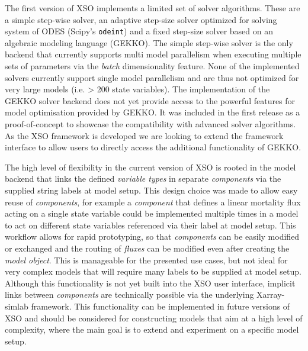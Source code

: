 \documentclass[journal abbreviation, manuscript]{copernicus}
\begin{document}
The first version of XSO implements a limited set of solver algorithms. These are a simple step-wise solver, an adaptive step-size solver optimized for solving system of ODES (Scipy's \texttt{odeint}) and a fixed step-size solver based on an algebraic modeling language (GEKKO). The simple step-wise solver is the only backend that currently supports multi model parallelism when executing multiple sets of parameters via the \textit{batch} dimensionality feature. None of the implemented solvers currently support single model parallelism and are thus not optimized for very large models (i.e. > 200 state variables).
The implementation of the GEKKO solver backend does not yet provide access to the powerful features for model optimisation provided by GEKKO. It was included in the first release as a proof-of-concept to showcase the compatibility with advanced solver algorithms. As the XSO framework is developed we are looking to extend the framework interface to allow users to directly access the additional functionality of GEKKO.

The high level of flexibility in the current version of XSO is rooted in the model backend that links the defined \textit{variable types} in separate \textit{components} via the supplied string labels at model setup. This design choice was made to allow easy reuse of \textit{components}, for example a \textit{component} that defines a linear mortality flux acting on a single state variable could be implemented multiple times in a model to act on different state variables referenced via their label at model setup. This workflow allows for rapid prototyping, so that \textit{components} can be easily modified or exchanged and the routing of \textit{fluxes} can be modified even after creating the \textit{model object}. This is manageable for the presented use cases, but not ideal for very complex models that will require many labels to be supplied at model setup. Although this functionality is not yet built into the XSO user interface, implicit links between \textit{components} are technically possible via the underlying Xarray-simlab framework. This functionality can be implemented in future versions of XSO and should be considered for constructing models that aim at a high level of complexity, where the main goal is to extend and experiment on a specific model setup.
\end{document}

